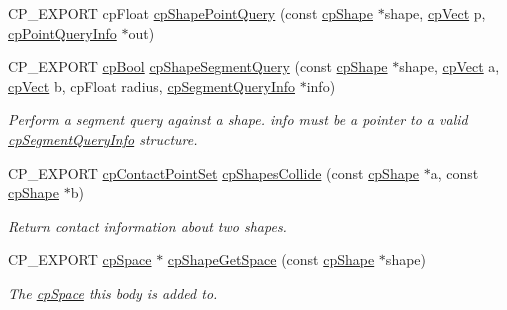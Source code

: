 \begin{DoxyCompactItemize}
C\+P\+\_\+\+E\+X\+P\+O\+RT cp\+Float \hyperlink{group__cpShape_ga5b0f787bc6f0d614d4616c08c807cd6c}{cp\+Shape\+Point\+Query} (const \hyperlink{structcpShape}{cp\+Shape} $\ast$shape, \hyperlink{structcpVect}{cp\+Vect} p, \hyperlink{structcpPointQueryInfo}{cp\+Point\+Query\+Info} $\ast$out)
\item 
\mbox{\label{group__cpShape_gaf25b8d53a1b0185824b1cfdd428c04b7}} 
C\+P\+\_\+\+E\+X\+P\+O\+RT \hyperlink{group__basicTypes_gabc5e752c48f3449ca26ef413ecbd647e}{cp\+Bool} \hyperlink{group__cpShape_gaf25b8d53a1b0185824b1cfdd428c04b7}{cp\+Shape\+Segment\+Query} (const \hyperlink{structcpShape}{cp\+Shape} $\ast$shape, \hyperlink{structcpVect}{cp\+Vect} a, \hyperlink{structcpVect}{cp\+Vect} b, cp\+Float radius, \hyperlink{structcpSegmentQueryInfo}{cp\+Segment\+Query\+Info} $\ast$info)
\begin{DoxyCompactList}\small\item\em Perform a segment query against a shape. {\ttfamily info} must be a pointer to a valid \hyperlink{structcpSegmentQueryInfo}{cp\+Segment\+Query\+Info} structure. \end{DoxyCompactList}\item 
\mbox{\label{group__cpShape_ga0afd273a80a6cbdf01cc93ca7a9975db}} 
C\+P\+\_\+\+E\+X\+P\+O\+RT \hyperlink{structcpContactPointSet}{cp\+Contact\+Point\+Set} \hyperlink{group__cpShape_ga0afd273a80a6cbdf01cc93ca7a9975db}{cp\+Shapes\+Collide} (const \hyperlink{structcpShape}{cp\+Shape} $\ast$a, const \hyperlink{structcpShape}{cp\+Shape} $\ast$b)
\begin{DoxyCompactList}\small\item\em Return contact information about two shapes. \end{DoxyCompactList}\item 
\mbox{\label{group__cpShape_ga8028b555d6186cf462211ed1a9e2d0ec}} 
C\+P\+\_\+\+E\+X\+P\+O\+RT \hyperlink{structcpSpace}{cp\+Space} $\ast$ \hyperlink{group__cpShape_ga8028b555d6186cf462211ed1a9e2d0ec}{cp\+Shape\+Get\+Space} (const \hyperlink{structcpShape}{cp\+Shape} $\ast$shape)
\begin{DoxyCompactList}\small\item\em The \hyperlink{structcpSpace}{cp\+Space} this body is added to. \end{DoxyCompactList}\item 
\mbox{\label{group__cpShape_gaa0615b0c5438d7cfec0d73d133e35e8e}} 

\end{DoxyCompactItemize}
